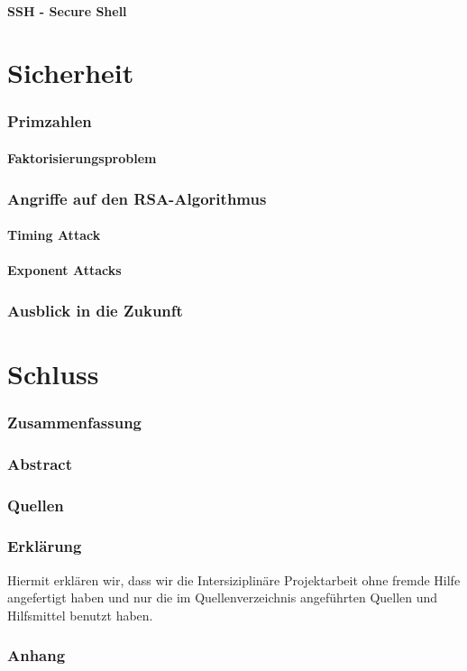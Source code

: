 \documentclass[12pt,a4paper,german]{article}
\begin{document}
\subsection{SSH - Secure Shell}

\newpage
\part{Sicherheit}
\section{Primzahlen}
\subsection{Faktorisierungsproblem}
\section{Angriffe auf den RSA-Algorithmus}
\subsection{Timing Attack}
\subsection{Exponent Attacks}
\section{Ausblick in die Zukunft}

\newpage
\part{Schluss}
\section{Zusammenfassung}
\section{Abstract}
\section{Quellen}
\section{Erklärung}
Hiermit erklären wir, dass wir die Intersiziplinäre Projektarbeit ohne fremde Hilfe angefertigt haben und nur die im Quellenverzeichnis angeführten Quellen und Hilfsmittel benutzt haben.
\section{Anhang}
\end{document}
